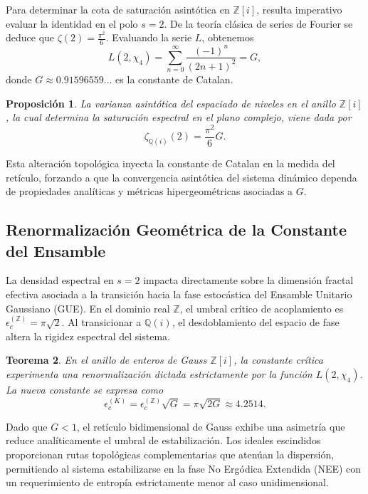 \documentclass{article}
\numberwithin{equation}{section}
\theoremstyle{plain}
\newtheorem{teorema}{Teorema}[section]
\newtheorem{proposicion}[teorema]{Proposición}
\theoremstyle{definition}
\begin{document}
Para determinar la cota de saturación asintótica en $\mathbb{Z}[i]$, resulta imperativo evaluar la identidad en el polo $s=2$. De la teoría clásica de series de Fourier se deduce que $\zeta(2) = \frac{\pi^2}{6}$. Evaluando la serie $L$, obtenemos
\begin{equation}
    L(2, \chi_4) = \sum_{n=0}^{\infty} \frac{(-1)^n}{(2n+1)^2} = G,
\end{equation}
donde $G \approx 0.91596559\dots$ es la constante de Catalan.

\begin{proposicion}
La varianza asintótica del espaciado de niveles en el anillo $\mathbb{Z}[i]$, la cual determina la saturación espectral en el plano complejo, viene dada por
\begin{equation}
    \zeta_{\mathbb{Q}(i)}(2) = \frac{\pi^2}{6} G.
\end{equation}
\end{proposicion}

Esta alteración topológica inyecta la constante de Catalan en la medida del retículo, forzando a que la convergencia asintótica del sistema dinámico dependa de propiedades analíticas y métricas hipergeométricas asociadas a $G$.

\subsection{Renormalización Geométrica de la Constante del Ensamble}

La densidad espectral en $s=2$ impacta directamente sobre la dimensión fractal efectiva asociada a la transición hacia la fase estocástica del Ensamble Unitario Gaussiano (GUE). En el dominio real $\mathbb{Z}$, el umbral crítico de acoplamiento es $\epsilon_c^{(\mathbb{Z})} = \pi\sqrt{2}$. Al transicionar a $\mathbb{Q}(i)$, el desdoblamiento del espacio de fase altera la rigidez espectral del sistema.

\begin{teorema}
\label{teo:acoplamiento_catalan}
En el anillo de enteros de Gauss $\mathbb{Z}[i]$, la constante crítica experimenta una renormalización dictada estrictamente por la función $L(2, \chi_4)$. La nueva constante se expresa como
\begin{equation}
    \epsilon_c^{(K)} = \epsilon_c^{(\mathbb{Z})} \sqrt{G} = \pi \sqrt{2G} \approx 4.2514.
\end{equation}
\end{teorema}

Dado que $G < 1$, el retículo bidimensional de Gauss exhibe una asimetría que reduce analíticamente el umbral de estabilización. Los ideales escindidos proporcionan rutas topológicas complementarias que atenúan la dispersión, permitiendo al sistema estabilizarse en la fase No Ergódica Extendida (NEE) con un requerimiento de entropía estrictamente menor al caso unidimensional.
\end{document}
